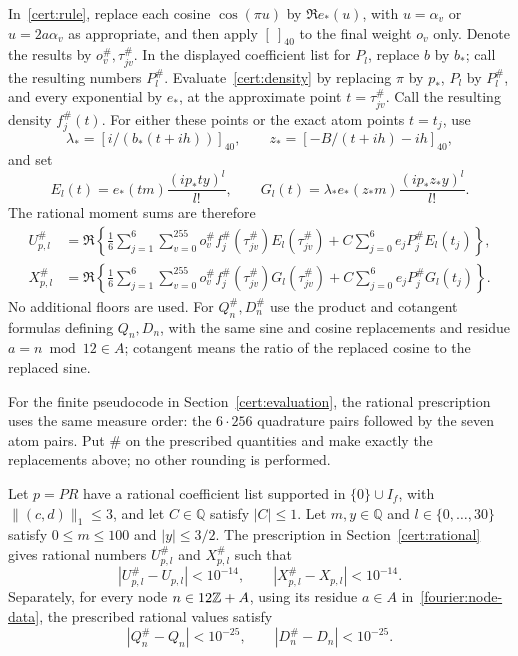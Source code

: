 In~\eqref{cert:rule}, replace each cosine $\cos(\pi u)$ by $\Re e_*(u)$,
with $u=\alpha_v$ or $u=2a\alpha_v$ as appropriate, and then apply
$[\ ]_{40}$ to the final weight $o_v$ only.  Denote the results by
$o_v^{\#},\tau_{jv}^{\#}$.  In the displayed coefficient list for $P_l$,
replace $b$ by $b_*$; call the resulting numbers $P_l^{\#}$.
Evaluate~\eqref{cert:density} by replacing $\pi$ by $p_*$, $P_l$ by
$P_l^{\#}$, and every exponential by $e_*$, at the approximate point
$t=\tau_{jv}^{\#}$.  Call the resulting density $f_j^{\#}(t)$.
For either these points or the exact atom points $t=t_j$, use
\begin{equation}\label{cert:lambda-z-star}
 \lambda_*=[i/(b_*(t+ih))]_{40},\qquad
 z_*=[-B/(t+ih)-ih]_{40},
\end{equation}
and set
\begin{equation}\label{cert:rational-factors}
 E_l(t)=e_*(tm)\frac{(ip_*ty)^l}{l!},\qquad
 G_l(t)=\lambda_*e_*(z_*m)\frac{(ip_*z_*y)^l}{l!}.
\end{equation}
The rational moment sums are therefore
\begin{equation}\label{cert:rational-moment-sums}
\begin{aligned}
 U_{p,l}^{\#}
 &=\Re\left\{\frac16\sum_{j=1}^6\sum_{v=0}^{255}
    o_v^{\#}f_j^{\#}(\tau_{jv}^{\#})E_l(\tau_{jv}^{\#})
       +C\sum_{j=0}^6e_jP_j^{\#}E_l(t_j)\right\},\\
 X_{p,l}^{\#}
 &=\Re\left\{\frac16\sum_{j=1}^6\sum_{v=0}^{255}
    o_v^{\#}f_j^{\#}(\tau_{jv}^{\#})G_l(\tau_{jv}^{\#})
       +C\sum_{j=0}^6e_jP_j^{\#}G_l(t_j)\right\}.
\end{aligned}
\end{equation}
No additional floors are used.  For $Q_n^{\#},D_n^{\#}$ use the product
and cotangent formulas defining $Q_n,D_n$, with the same sine and cosine
replacements and residue $a=n\bmod12\in A$; cotangent means the ratio of
the replaced cosine to the replaced sine.


For the finite pseudocode in Section~\ref{cert:evaluation}, the rational
prescription uses the same measure order: the $6\cdot256$ quadrature pairs
followed by the seven atom pairs.  Put $\#$ on the prescribed quantities
and make exactly the replacements above; no other rounding is performed.

\begin{lemma}\label{cert:rational-moment-error}
Let $p=PR$ have a rational coefficient list supported in
$\{0\}\cup I_f$, with $\|(c,d)\|_1\le3$, and let $C\in\mathbb Q$
satisfy $|C|\le1$.  Let $m,y\in\mathbb Q$ and
$l\in\{0,\ldots,30\}$ satisfy $0\le m\le100$ and $|y|\le3/2$.
The prescription in Section~\ref{cert:rational} gives rational numbers
$U_{p,l}^{\#}$ and $X_{p,l}^{\#}$ such that
\[
 |U_{p,l}^{\#}-U_{p,l}|<10^{-14},\qquad
 |X_{p,l}^{\#}-X_{p,l}|<10^{-14}.
\]
Separately, for every node $n\in12\mathbb Z+A$, using its residue $a\in A$
in~\eqref{fourier:node-data}, the prescribed rational values satisfy
\[
 |Q_n^{\#}-Q_n|<10^{-25},\qquad |D_n^{\#}-D_n|<10^{-25}.
\]
\end{lemma}


